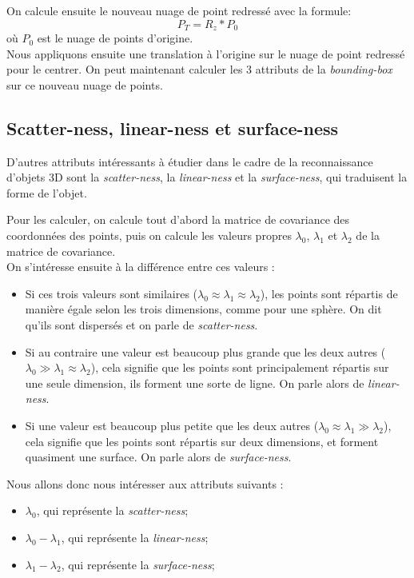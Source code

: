 		On calcule ensuite le nouveau nuage de point redressé avec la formule:
		\[ P_T = R_z * P_0\]
		où $P_0$ est le nuage de points d'origine. \\

		Nous appliquons ensuite une translation à l'origine sur le nuage de point redressé pour le centrer. On peut maintenant calculer les 3 attributs de la \emph{bounding-box} sur ce nouveau nuage de points.


	\subsection{Scatter-ness, linear-ness et surface-ness}
		D'autres attributs intéressants à étudier dans le cadre de la reconnaissance d'objets 3D sont la \emph{scatter-ness}, la \emph{linear-ness} et la \emph{surface-ness}, qui traduisent la forme de l'objet. 

		Pour les calculer, on calcule tout d'abord la matrice de covariance des coordonnées des points, puis on calcule les valeurs propres $\lambda_0$, $\lambda_1$ et $\lambda_2$ de la matrice de covariance. \\

		On s’intéresse ensuite à la différence entre ces valeurs : 
		\begin{itemize}
			\item Si ces trois valeurs sont similaires ($\lambda_0 \approx \lambda_1 \approx \lambda_2$), les points sont répartis de manière égale selon les trois dimensions, comme pour une sphère. On dit qu'ils sont dispersés et on parle de \emph{scatter-ness}.
			\item Si au contraire une valeur est beaucoup plus grande que les deux autres ($\lambda_0 \gg \lambda_1 \approx \lambda_2$), cela signifie que les points sont principalement répartis sur une seule dimension, ils forment une sorte de ligne. On parle alors de \emph{linear-ness}.
			\item Si une valeur est beaucoup plus petite que les deux autres ($\lambda_0 \approx \lambda_1 \gg \lambda_2$), cela signifie que les points sont répartis sur deux dimensions, et forment quasiment une surface. On parle alors de \emph{surface-ness}.\\
		\end{itemize}

		Nous allons donc nous intéresser aux attributs suivants :
		\begin{itemize}
			\item $\lambda_0$, qui représente la \emph{scatter-ness};
			\item $\lambda_0 - \lambda_1$, qui représente la \emph{linear-ness};
			\item $\lambda_1 - \lambda_2$, qui représente la \emph{surface-ness};
		\end{itemize}

